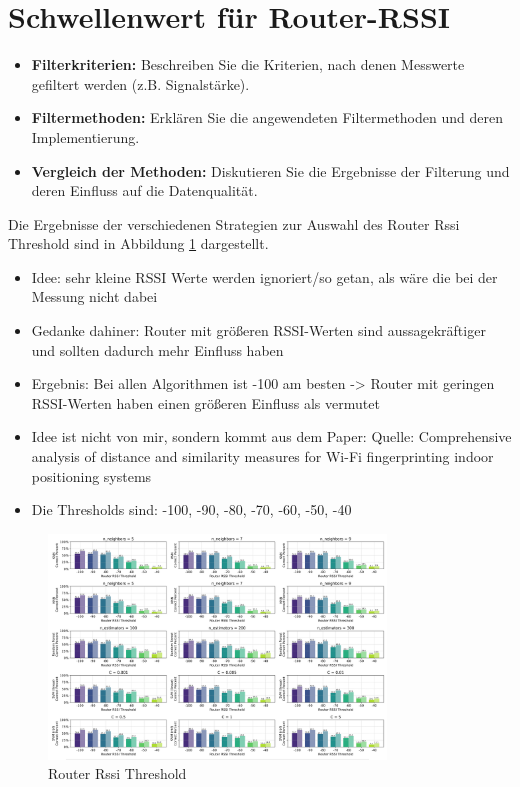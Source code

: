 \section{Schwellenwert für Router-RSSI}
\begin{itemize}
    \item \textbf{Filterkriterien:} Beschreiben Sie die Kriterien, nach denen Messwerte gefiltert werden (z.B. Signalstärke).
    \item \textbf{Filtermethoden:} Erklären Sie die angewendeten Filtermethoden und deren Implementierung.
    \item \textbf{Vergleich der Methoden:} Diskutieren Sie die Ergebnisse der Filterung und deren Einfluss auf die Datenqualität.
\end{itemize}

Die Ergebnisse der verschiedenen Strategien zur Auswahl des Router Rssi Threshold sind in Abbildung \ref{fig:6_router_rssi_threshold_01} dargestellt.

\begin{itemize}
    \item Idee: sehr kleine RSSI Werte werden ignoriert/so getan, als wäre die bei der Messung nicht dabei
    \item Gedanke dahiner: Router mit größeren RSSI-Werten sind aussagekräftiger und sollten dadurch mehr Einfluss haben
    \item Ergebnis: Bei allen Algorithmen ist -100 am besten -> Router mit geringen RSSI-Werten haben einen größeren Einfluss als vermutet
    \item Idee ist nicht von mir, sondern kommt aus dem Paper: Quelle: Comprehensive analysis of distance and similarity measures for Wi-Fi fingerprinting indoor positioning systems
    \item Die Thresholds sind: -100, -90, -80, -70, -60, -50, -40
\end{itemize}    

\begin{figure}[H]
    \centering
    \includegraphics[width=0.8\textwidth]{images/6_router_rssi_threshold_01.png}
    \caption{Router Rssi Threshold}
    \label{fig:6_router_rssi_threshold_01}
\end{figure}

